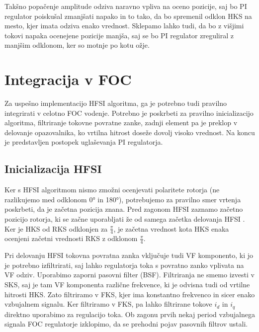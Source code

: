 \documentclass[a4paper,twoside,openright,12pt,slovene]{book}
\begin{document}
Takšno popačenje amplitude odziva naravno vpliva na oceno pozicije, saj bo PI regulator poiskušal zmanjšati napako in to tako, da bo spremenil odklon HKS na mesto, kjer imata odziva enako vrednost.
Sklepamo lahko tudi, da bo z višjimi tokovi napaka ocenejene pozicije manjša, saj se bo PI regulator zreguliral z manjšim odklonom, ker so motnje po kotu ožje.

\chapter{Integracija v FOC} \label{integracija}

Za uspešno implementacijo HFSI algoritma, ga je potrebno tudi pravilno integrirati v celotno FOC vodenje. Potrebno je poskrbeti za pravilno inicializacijo algoritma, filtriranje tokovne povratne
zanke, zadnji element pa je preklop v delovanje opazovalnika, ko vrtilna hitrost doseže dovolj visoko vrednost. Na koncu je predstavljen postopek uglaševanja PI regulatorja.

\section{Inicializacija HFSI}

Ker s HFSI algoritmom nismo zmožni ocenjevati polaritete rotorja (ne razlikujemo med odklonom 0° in 180°), potrebujemo za pravilno smer vrtenja poskrbeti, da je začetna pozicija znana. Pred zagonom
HFSI zaznamo začetno pozicijo rotorja, ki se začne uporabljati že od samega začetka delovanja HFSI \cite{IPDBoussak}. Ker je HKS od RKS odklonjen za $\frac{\pi}{4}$, je začetna vrednost kota HKS enaka
ocenjeni začetni vrednosti RKS z odklonom $\frac{\pi}{4}$.

Pri delovanju HFSI tokovna povratna zanka vključuje tudi VF komponento, ki jo je potrebno izfiltrirati, saj lahko regulatorja toka s povratno zanko vplivata na VF odziv. Uporabimo zaporni pasovni
filter (BSF). Filtriranja ne smemo izvesti v SKS, saj je tam VF komponenta različne frekvence, ki je odvisna tudi od vrtilne hitrosti HKS. Zato filtriramo v FKS, kjer ima konstantno frekvenco in sicer
enako vzbujalnem signalu. Ker filtriramo v FKS, pa lahko filtrirane tokove $i_d$ in $i_q$ direktno uporabimo za regulacijo toka. Ob zagonu prvih nekaj period vzbujalnega signala FOC regulatorje
izklopimo, da se prehodni pojav pasovnih filtrov ustali. 
\end{document}

